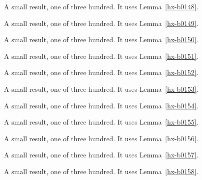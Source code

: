 \begin{lemma}[Bulk 149]\label{hx-b0149}
A small result, one of three hundred. It uses Lemma~\ref{hx-b0148}.
\end{lemma}

\begin{lemma}[Bulk 150]\label{hx-b0150}
A small result, one of three hundred. It uses Lemma~\ref{hx-b0149}.
\end{lemma}

\begin{lemma}[Bulk 151]\label{hx-b0151}
A small result, one of three hundred. It uses Lemma~\ref{hx-b0150}.
\end{lemma}

\begin{lemma}[Bulk 152]\label{hx-b0152}
A small result, one of three hundred. It uses Lemma~\ref{hx-b0151}.
\end{lemma}

\begin{lemma}[Bulk 153]\label{hx-b0153}
A small result, one of three hundred. It uses Lemma~\ref{hx-b0152}.
\end{lemma}

\begin{lemma}[Bulk 154]\label{hx-b0154}
A small result, one of three hundred. It uses Lemma~\ref{hx-b0153}.
\end{lemma}

\begin{lemma}[Bulk 155]\label{hx-b0155}
A small result, one of three hundred. It uses Lemma~\ref{hx-b0154}.
\end{lemma}

\begin{lemma}[Bulk 156]\label{hx-b0156}
A small result, one of three hundred. It uses Lemma~\ref{hx-b0155}.
\end{lemma}

\begin{lemma}[Bulk 157]\label{hx-b0157}
A small result, one of three hundred. It uses Lemma~\ref{hx-b0156}.
\end{lemma}

\begin{lemma}[Bulk 158]\label{hx-b0158}
A small result, one of three hundred. It uses Lemma~\ref{hx-b0157}.
\end{lemma}

\begin{lemma}[Bulk 159]\label{hx-b0159}
A small result, one of three hundred. It uses Lemma~\ref{hx-b0158}.
\end{lemma}


